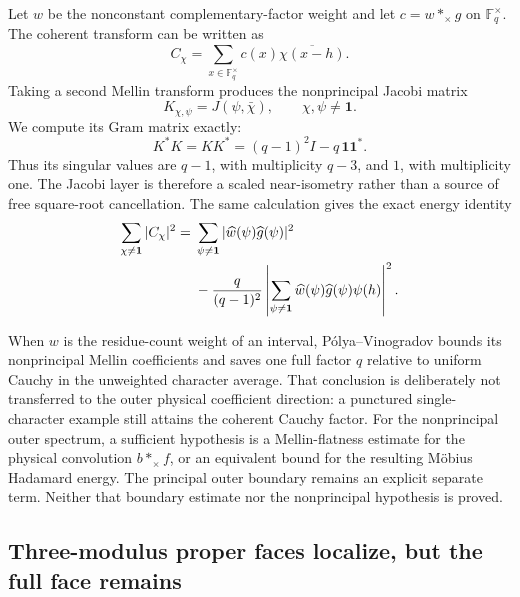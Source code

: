 Let $w$ be the nonconstant complementary-factor weight and let
$c=w*_\times g$ on $\mathbb F_q^\times$.  The coherent transform can
be written as
\begin{equation}
 C_\chi=\sum_{x\in\mathbb F_q^\times}
 c(x)\overline{\chi(x-h)}.
 \label{eq:tpc37-intro-shifted-Mellin}
\end{equation}
Taking a second Mellin transform produces the nonprincipal Jacobi matrix
\begin{equation}
 K_{\chi,\psi}=J(\psi,\bar\chi),
 \qquad \chi,\psi\ne\mathbf1.
 \label{eq:tpc37-intro-Jacobi-matrix}
\end{equation}
We compute its Gram matrix exactly:
\begin{equation}
 \boxed{
 K^*K=KK^*=(q-1)^2I-q\,\mathbf1\mathbf1^*.}
 \label{eq:tpc37-intro-Jacobi-Gram}
\end{equation}
Thus its singular values are $q-1$, with multiplicity $q-3$, and
$1$, with multiplicity one.  The Jacobi layer is therefore a scaled
near-isometry rather than a source of free square-root cancellation.
The same calculation gives the exact energy identity
\begin{align}
 \sum_{\chi\ne\mathbf1}|C_\chi|^2
 ={}&\sum_{\psi\ne\mathbf1}
 |\widehat w(\psi)\widehat g(\psi)|^2 \notag\\
 &-\frac q{(q-1)^2}
 \left|\sum_{\psi\ne\mathbf1}
 \widehat w(\psi)\widehat g(\psi)\psi(h)\right|^2.
 \label{eq:tpc37-intro-Jacobi-energy}
\end{align}

When $w$ is the residue-count weight of an interval,
P\'olya--Vinogradov bounds its nonprincipal Mellin coefficients and saves
one full factor $q$ relative to uniform Cauchy in the unweighted
character average.  That conclusion is deliberately not transferred to
the outer physical coefficient direction: a punctured single-character
example still attains the coherent Cauchy factor.  For the nonprincipal
outer spectrum, a sufficient hypothesis is a Mellin-flatness estimate for
the physical convolution \(b*_\times f\), or an equivalent bound for the
resulting M\"obius Hadamard energy.  The principal outer boundary remains
an explicit separate term.  Neither that boundary estimate nor the
nonprincipal hypothesis is proved.

\subsection{Three-modulus proper faces localize, but the full face remains}

